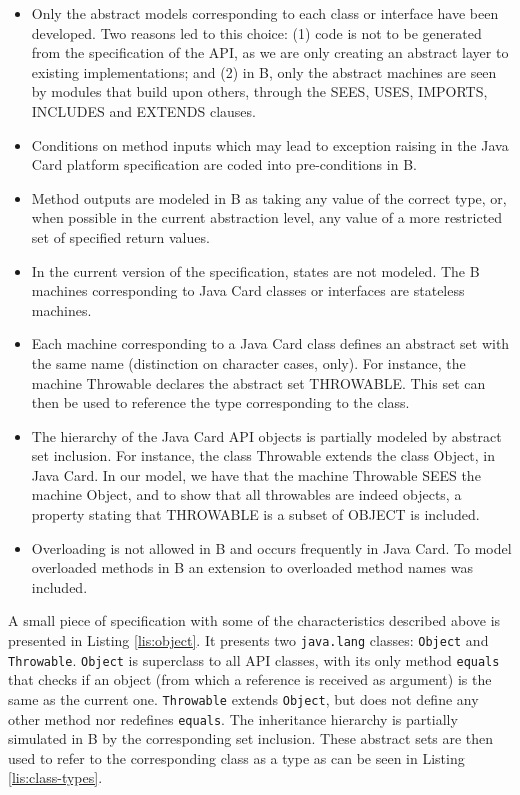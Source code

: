 \documentclass{llncs}
\begin{document}
\begin{itemize}

\item Only the abstract models corresponding to each class or
  interface have been developed. Two reasons led to this choice: (1)
  code is not to be generated from the specification of the API, as we
  are only creating an abstract layer to existing implementations; and
  (2) in B, only the abstract machines are seen by modules that build
  upon others, through the SEES, USES, IMPORTS, INCLUDES and EXTENDS
  clauses.

\item Conditions on method inputs which may lead to exception raising
  in the Java Card platform specification are coded into
  pre-conditions in B.
  
\item Method outputs are modeled in B as taking any value of the
  correct type, or, when possible in the current abstraction level,
  any value of a more restricted set of specified return values.
  
  \item In the current version of the specification, states are not modeled. 
  The B machines corresponding to Java Card classes or interfaces are stateless machines. 
  
\item Each machine corresponding to a Java Card class defines an
  abstract set with the same name (distinction on character cases,
  only). For instance, the machine Throwable declares the abstract set
  THROWABLE. This set can then be used to reference the type
  corresponding to the class.

\item The hierarchy of the Java Card API objects is partially modeled
  by abstract set inclusion. For instance, the class Throwable extends
  the class Object, in Java Card. In our model, we  have that the
  machine Throwable SEES the machine Object, and to show that all throwables are indeed
  objects, a property stating that THROWABLE is a subset of OBJECT is
  included.

\item Overloading is not allowed in B and occurs frequently in Java
  Card. To model overloaded methods in B an extension to overloaded
  method names was included.
  
  \end{itemize}

A small piece of specification with some of the characteristics described above is presented in Listing \ref{lis:object}. It presents two \texttt{java.lang} classes: \texttt{Object} and \texttt{Throwable}.  \texttt{Object} is  superclass to  all API classes, with its only method  \texttt{equals} that checks if an object (from which a reference is received as argument) is the same as the current one. \texttt{Throwable} extends \texttt{Object}, but does not define any other method nor redefines \texttt{equals}. The inheritance hierarchy is partially simulated in B by the corresponding set inclusion. These abstract sets are then used to refer to the corresponding class as a type as can be seen in Listing \ref{lis:class-types}.
\end{document}
